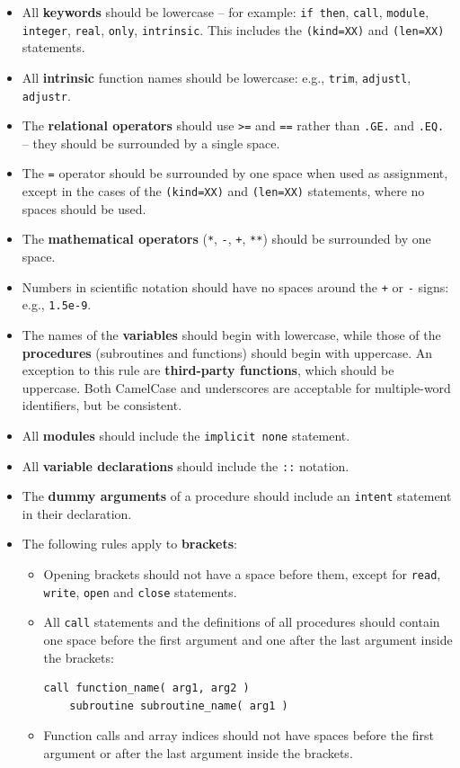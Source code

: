 \begin{itemize}
\item All \textbf{keywords} should be lowercase -- for example: \texttt{if\ then},
  \texttt{call}, \texttt{module}, \texttt{integer}, \texttt{real}, \texttt{only},
  \texttt{intrinsic}. This includes the \texttt{(kind=XX)} and \texttt{(len=XX)} statements.
\item All \textbf{intrinsic} function names should be lowercase: e.g., \texttt{trim},
  \texttt{adjustl}, \texttt{adjustr}.
\item The \textbf{relational operators} should use \texttt{>=} and \texttt{==} rather than
  \texttt{.GE.} and \texttt{.EQ.} -- they should be surrounded by a single space.
\item The \texttt{=} operator should be surrounded by one space when used as assignment, except
  in the cases of the \texttt{(kind=XX)} and \texttt{(len=XX)} statements, where no spaces
  should be used.
\item The \textbf{mathematical operators} (\texttt{*}, \texttt{-}, \texttt{+}, \texttt{**})
  should be surrounded by one space.
\item Numbers in scientific notation should have no spaces around the \texttt{+} or \texttt{-}
  signs: e.g., \texttt{1.5e-9}.
\item The names of the \textbf{variables} should begin with lowercase, while those of the
  \textbf{procedures} (subroutines and functions) should begin with uppercase. An exception to
  this rule are \textbf{third-party functions}, which should be uppercase. Both CamelCase and
  underscores are acceptable for multiple-word identifiers, but be consistent.
\item All \textbf{modules} should include the \texttt{implicit none} statement.
\item All \textbf{variable declarations} should include the \texttt{::} notation.
\item The \textbf{dummy arguments} of a procedure should include an \texttt{intent} statement
  in their declaration.
\item The following rules apply to \textbf{brackets}:
  \begin{itemize}
  \item Opening brackets should not have a space before them, except for \texttt{read},
    \texttt{write}, \texttt{open} and \texttt{close} statements.
  \item All \texttt{call} statements and the definitions of all procedures should contain one
    space before the first argument and one after the last argument inside the brackets:
    \begin{Verbatim}[fontsize=\small]
    call function_name( arg1, arg2 )
    subroutine subroutine_name( arg1 )
    \end{Verbatim}
  \item Function calls and array indices should not have spaces before the first argument or
    after the last argument inside the brackets.
  \end{itemize}
\end{itemize}
